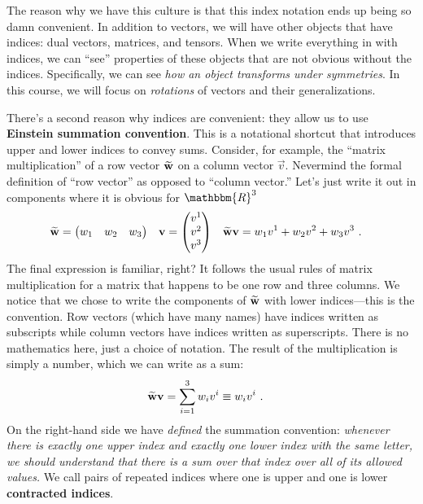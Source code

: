 \documentclass[12pt]{article}
\begin{document}
The reason why we have this culture is that this index notation ends up being so damn convenient. In addition to vectors, we will have other objects that have indices: dual vectors, matrices, and tensors. When we write everything in with indices, we can ``see'' properties of these objects that are not obvious without the indices. Specifically, we can see \emph{how an object transforms under symmetries}. In this course, we will focus on \emph{rotations} of vectors and their generalizations.  


There's a second reason why indices are convenient: they allow us to use \textbf{Einstein summation convention}. This is a notational shortcut that introduces upper and lower indices to convey sums. Consider, for example, the ``matrix multiplication'' of a row vector $\widetilde{\mathbf{w}}$ on a column vector $\vec{v}$. Nevermind the formal definition of ``row vector'' as opposed to ``column vector.'' Let's just write it out in components where it is obvious for $\mathbbm{R}^3$
\begin{align}
    \widetilde{\mathbf{w}}
    &=
    \begin{pmatrix}
        w_1 & w_2 & w_3
    \end{pmatrix}
    &
    \mathbf{v}
    &=
    \begin{pmatrix}
        v^1 \\ v^2 \\ v^3
    \end{pmatrix}
    &
    \widetilde{\mathbf{w}}\mathbf{v}
    &= w_1v^1 + w_2v^2+w_3v^3 \ .
\end{align}
The final expression is familiar, right? It follows the usual rules of matrix multiplication for a matrix that happens to be one row and three columns. We notice that we chose to write the components of $\widetilde{\mathbf{w}}$ with lower indices---this is the convention. Row vectors (which have many names) have indices written as subscripts while column vectors have indices written as superscripts. There is no mathematics here, just a choice of notation. The result of the multiplication is simply a number, which we can write as a sum:
\begin{align}
    \widetilde{\mathbf{w}}\mathbf{v}
    &= \sum_{i=1}^3 w_iv^i
    \equiv w_iv^i \ .
    \label{eq:row:w:on:vec:v}
\end{align}
On the right-hand side we have \emph{defined} the summation convention: \emph{whenever there is exactly one upper index and exactly one lower index with the same letter, we should understand that there is a sum over that index over all of its allowed values.} We call pairs of repeated indices where one is upper and one is lower \textbf{contracted indices}.
\end{document}
